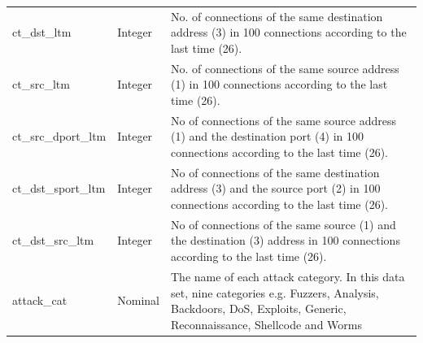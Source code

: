 \documentclass[conference, 10pt]{IEEEtran}
\begin{document}
\begin{table}[H]
\begin{tabularx}{\columnwidth}{@{}>{\ttfamily}l l >{\raggedright\arraybackslash}X@{}}
    ct\_dst\_ltm & Integer & No. of connections of the same destination address (3) in 100 connections according to the last time (26). \\ \addlinespace[4pt]
    ct\_src\_ltm & Integer & No. of connections of the same source address (1) in 100 connections according to the last time (26). \\ \addlinespace[4pt]
    ct\_src\_dport\_ltm & Integer & No of connections of the same source address (1) and the destination port (4) in 100 connections according to the last time (26). \\ \addlinespace[4pt]
    ct\_dst\_sport\_ltm & Integer & No of connections of the same destination address (3) and the source port (2) in 100 connections according to the last time (26). \\ \addlinespace[4pt]
    ct\_dst\_src\_ltm & Integer & No of connections of the same source (1) and the destination (3) address in 100 connections according to the last time (26). \\ \addlinespace[4pt]
    attack\_cat & Nominal & The name of each attack category. In this data set, nine categories e.g. Fuzzers, Analysis, Backdoors, DoS, Exploits, Generic, Reconnaissance, Shellcode and Worms \\
    \bottomrule
    \end{tabularx}
\end{table}



\end{document}
